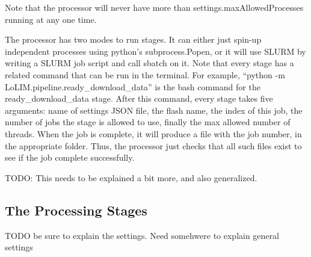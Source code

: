 \documentclass[]{article}
\begin{document}
Note that the processor will never have more than settings.maxAllowedProcesses running at any one time. 

The processor has two modes to run stages. It can either just spin-up independent processes using python's subprocess.Popen, or it will use SLURM by writing a SLURM job script and call sbatch on it. Note that every stage has a related command that can be run in the terminal. For example, ``python -m LoLIM.pipeline.ready\_download\_data'' is the bash command for the ready\_download\_data stage. After this command, every stage takes five arguments: name of settings JSON file, the flash name, the index of this job, the number of jobs the stage is allowed to use, finally the max allowed number of threads. When the job is complete, it will produce a file with the job number, in the appropriate folder. Thus, the processor just checks that all such files exist to see if the job complete successfully. 

TODO: This needs to be explained a bit more, and also generalized. 

\subsection{The Processing Stages}

TODO be sure to explain the settings. Need somehwere to explain general settings
\end{document}
